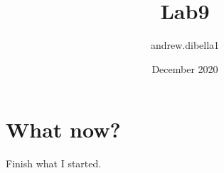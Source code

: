 \documentclass{article}
\title{Lab9}
\author{andrew.dibella1 }
\date{December 2020}
\begin{document}
\maketitle

\section{What now?}
Finish what I started.
\end{document}
